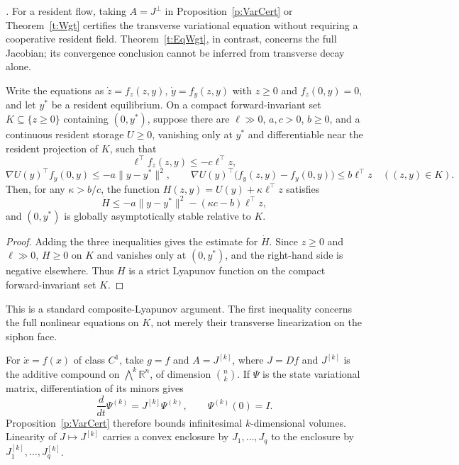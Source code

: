 \emph{.}
For a resident flow, taking $A=J^\perp$ in
Proposition~\ref{p:VarCert} or Theorem~\ref{t:Wgt} certifies the transverse
variational equation without requiring a cooperative resident field.
Theorem~\ref{t:EqWgt}, in contrast, concerns the full Jacobian; its
convergence conclusion cannot be inferred from transverse decay alone.

Write the equations as $\dot z=f_z(z,y)$, $\dot y=f_y(z,y)$ with $z\ge0$ and $f_z(0,y)=0$, and let
$y^*$ be a resident equilibrium. On a compact forward-invariant set $K\subseteq\{z\ge0\}$ containing
$(0,y^*)$, suppose there are $\ell\gg0$, $a,c>0$, $b\ge0$, and a continuous resident storage
$U\ge0$, vanishing only at $y^*$ and differentiable near the resident projection of $K$, such that
\[
 \ell^\top f_z(z,y)\le-c\ell^\top z,
\]
\[
 \nabla U(y)^\top f_y(0,y)\le-a\|y-y^*\|^2,
 \qquad
 \nabla U(y)^\top\bigl(f_y(z,y)-f_y(0,y)\bigr)\le b\ell^\top z
 \quad ((z,y)\in K).
\]
Then, for any $\kappa>b/c$, the function $H(z,y)=U(y)+\kappa\ell^\top z$ satisfies
\[
 \dot H\le-a\|y-y^*\|^2-(\kappa c-b)\ell^\top z,
\]
and $(0,y^*)$ is globally asymptotically stable relative to $K$.
\eeP
\begin{proof}
Adding the three inequalities gives the estimate for $\dot H$. Since $z\ge0$ and $\ell\gg0$, $H\ge0$ on
$K$ and vanishes only at $(0,y^*)$, and the right-hand side is negative elsewhere. Thus $H$ is a strict
Lyapunov function on the compact forward-invariant set $K$.
\end{proof}
This is a standard composite-Lyapunov argument. The first inequality concerns the full nonlinear
equations on $K$, not merely their transverse linearization on the siphon face.

\ifshort\else
For $\dot x=f(x)$ of class $C^1$, take $g=f$ and
$A=J^{[k]}$, where $J=Df$ and $J^{[k]}$ is the additive compound on
$\bigwedge^k\mathbb R^n$, of dimension $\binom nk$.
If $\Psi$ is the state variational matrix, differentiation of its minors gives
\[
 \frac{d}{dt}\Psi^{(k)}=J^{[k]}\Psi^{(k)},\qquad \Psi^{(k)}(0)=I.
\]
Proposition~\ref{p:VarCert} therefore bounds infinitesimal
$k$-dimensional volumes. Linearity of $J\mapsto J^{[k]}$ carries a
convex enclosure by $J_1,\ldots,J_q$ to the enclosure by
$J_1^{[k]},\ldots,J_q^{[k]}$.

